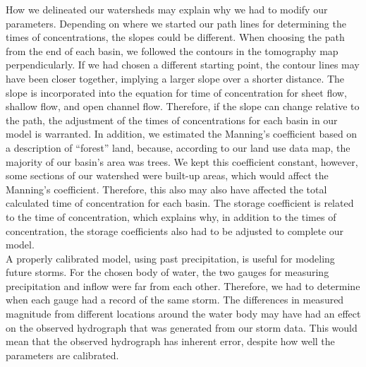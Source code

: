 \documentclass{article}
\begin{document}
\indent How we delineated our watersheds may explain why we had to modify our parameters. Depending on where we started our path lines for determining the times of concentrations, the slopes could be different. When choosing the path from the end of each basin, we followed the contours in the tomography map perpendicularly. If we had chosen a different starting point, the contour lines may have been closer together, implying a larger slope over a shorter distance. The slope is incorporated into the equation for time of concentration for sheet flow, shallow flow, and open channel flow. Therefore, if the slope can change relative to the path, the adjustment of the times of concentrations for each basin in our model is warranted. In addition, we estimated the Manning's coefficient based on a description of ``forest'' land, because, according to our land use data map, the majority of our basin's area was trees. We kept this coefficient constant, however, some sections of our watershed were built-up areas, which would affect the Manning's coefficient. Therefore, this also may also have affected the total calculated time of concentration for each basin. The storage coefficient is related to the time of concentration, which explains why, in addition to the times of concentration, the storage coefficients also had to be adjusted to complete our model. \\
\indent A properly calibrated model, using past precipitation, is useful for modeling future storms. For the chosen body of water, the two gauges for measuring precipitation and inflow were far from each other. Therefore, we had to determine when each gauge had a record of the same storm. The differences in measured magnitude from different locations around the water body may have had an effect on the observed hydrograph that was generated from our storm data. This would mean that the observed hydrograph has inherent error, despite how well the parameters are calibrated. \\
\end{document}
